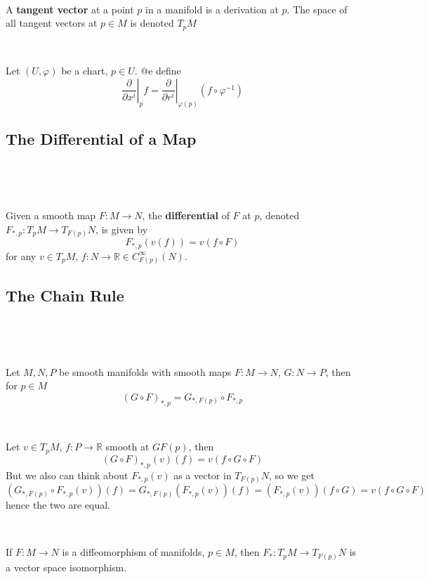 \documentclass{article}
\begin{document}
\begin{definition}
  \

  A \textbf{tangent vector} at a point $p$ in a manifold is a derivation at $p$. The space of all tangent vectors at $p \in M$ is denoted $T_pM$
\end{definition}

\begin{definition}
  \

  Let $(U,\varphi)$ be a chart, $p \in U$. @e define $$\left.\frac{\partial}{\partial x^i} \right\vert_p f = \left.\frac{\partial}{\partial r^i} \right\vert_{\varphi(p)} (f \circ \varphi ^{-1})$$
\end{definition}

\subsection{The Differential of a Map}
\

\begin{definition}
  \

  Given a smooth map $F: M \to N$, the \textbf{differential} of $F$ at $p$, denoted $F_{*,p}: T_pM \to T_{F(p)}N$, is given by $$F_{*,p}(v(f)) = v(f \circ F)$$for any $v \in T_pM$, $f: N \to \mathbb{R} \in C^\infty_{F(p)}(N)$.
\end{definition}

\subsection{The Chain Rule}
\

\begin{theorem}
  \

  Let $M, N, P$ be smooth manifolds with smooth maps $F: M \to N$, $G: N \to P$, then for $p\in M$ $$(G \circ F)_{*,p} = G_{*, F(p)} \circ F_{*,p}$$
\end{theorem}

\begin{customproof}
  \

  Let $v \in T_pM$, $f: P \to \mathbb{R}$ smooth at $GF(p)$, then$$(G \circ F)_{*, p}(v)(f) = v(f \circ G \circ F)$$But we also can think about $F_{*,p}(v)$ as a vector in $T_{F(p)}N$, so we get $$(G_{*, F(p)} \circ F_{*, p}(v))(f) = G_{*,F(p)}(F_{*,p}(v))(f) = (F_{*,p}(v))(f \circ G) = v(f \circ G \circ F)$$hence the two are equal.
\end{customproof}

\begin{corollary}
  \

  If $F: M \to N$ is a diffeomorphism of manifolds, $p \in M$, then $F_*: T_pM \to T_{F(p)}N$ is a vector space isomorphism.
\end{corollary}
\end{document}
